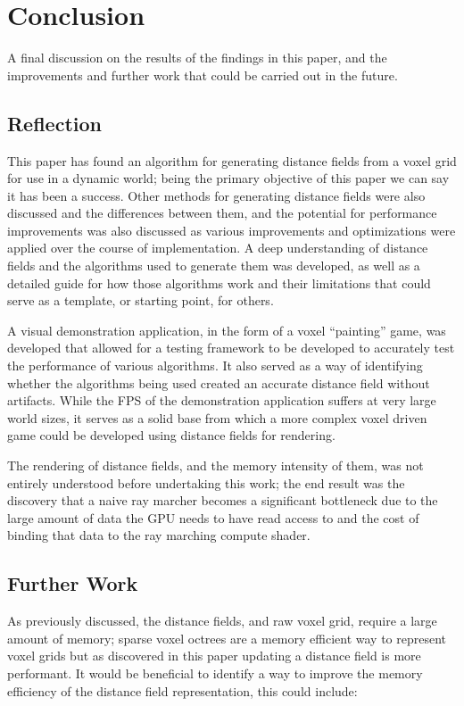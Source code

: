 \chapter{Conclusion}
A final discussion on the results of the findings in this paper, and the improvements and further work that could be
carried out in the future.

\section{Reflection}
This paper has found an algorithm for generating distance fields from a voxel grid for use in a dynamic world; being
the primary objective of this paper we can say it has been a success. Other methods for generating distance fields
were also discussed and the differences between them, and the potential for performance improvements was also discussed
as various improvements and optimizations were applied over the course of implementation. A deep understanding of
distance fields and the algorithms used to generate them was developed, as well as a detailed guide for how those
algorithms work and their limitations that could serve as a template, or starting point, for others.

A visual demonstration application, in the form of a voxel ``painting'' game, was developed that allowed for a
testing framework to be developed to accurately test the performance of various algorithms. It also served as a way
of identifying whether the algorithms being used created an accurate distance field without artifacts. While the FPS of
the demonstration application suffers at very large world sizes, it serves as a solid base from which a more complex
voxel driven game could be developed using distance fields for rendering.

The rendering of distance fields, and the memory intensity of them, was not entirely understood before undertaking this
work; the end result was the discovery that a naive ray marcher becomes a significant bottleneck due to the large amount
of data the GPU needs to have read access to and the cost of binding that data to the ray marching compute shader.

\section{Further Work}
As previously discussed, the distance fields, and raw voxel grid, require a large amount of memory; sparse voxel octrees
are a memory efficient way to represent voxel grids but as discovered in this paper updating a distance field is more
performant. It would be beneficial to identify a way to improve the memory efficiency of the distance field
representation, this could include:

